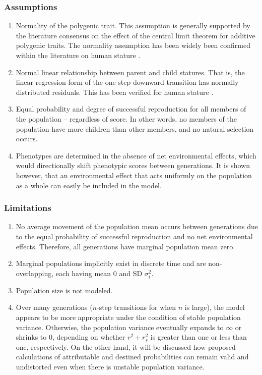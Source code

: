 \documentclass[a4paper,11pt]{article} %
\begin{document}
\subsubsection*{Assumptions}
\begin{enumerate}
\item Normality of the polygenic trait. This assumption is generally supported by the literature consensus on the effect of the central limit theorem for additive polygenic traits. The normality assumption has been widely been confirmed within the literature on human stature \cite{luo}.
\item Normal linear relationship between parent and child statures. That is, the linear regression form of the one-step downward transition has normally distributed residuals. This has been verified for human stature \cite{luo}.
\item Equal probability and degree of successful reproduction for all members of the population -- regardless of score. In other words, no members of the population have more children than other members, and no natural selection occurs. 
\item Phenotypes are determined in the absence of net environmental effects, which would directionally shift phenotypic scores between generations. It is shown however, that an environmental effect that acts uniformly on the population as a whole can easily be included in the model. 
\end{enumerate}

\subsubsection*{Limitations}
\begin{enumerate}
\item No average movement of the population mean occurs between generations due to the equal probability of successful reproduction and no net environmental effects. Therefore, all generations have marginal population mean zero.
\item Marginal populations implicitly exist in discrete time and are non-overlapping, each having mean $0$ and SD $\sigma_i^2$.
\item Population size is not modeled. 
\item Over many generations ($n$-step transitions for when $n$ is large), the model appears to be more appropriate under the condition of stable population variance. Otherwise, the population variance eventually expands to $\infty$ or shrinks to $0$, depending on whether $r^2 + r_s^2$ is greater than one or less than one, respectively. On the other hand, it will be discussed how proposed calculations of attributable and destined probabilities can remain valid and undistorted even when there is unstable population variance.
\end{enumerate}
\end{document}
